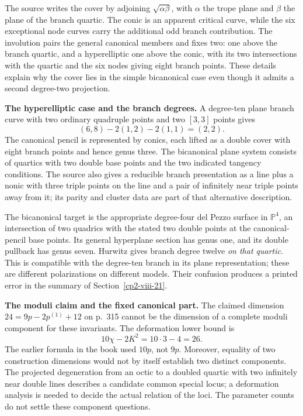 The source writes the cover by adjoining \(\sqrt{\alpha\beta}\), with \(\alpha\) the trope plane and \(\beta\) the plane of the branch quartic. The conic is an apparent critical curve, while the six exceptional node curves carry the additional odd branch contribution. The involution pairs the general canonical members and fixes two: one above the branch quartic, and a hyperelliptic one above the conic, with its two intersections with the quartic and the six nodes giving eight branch points. These details explain why the cover lies in the simple bicanonical case even though it admits a second degree-two projection.

\textbf{The hyperelliptic case and the branch degrees.}
A degree-ten plane branch curve with two ordinary quadruple points and two \([3,3]\) points gives
\[
(6,8)-2(1,2)-2(1,1)=(2,2).
\]
The canonical pencil is represented by conics, each lifted as a double cover with eight branch points and hence genus three. The bicanonical plane system consists of quartics with two double base points and the two indicated tangency conditions. The source also gives a reducible branch presentation as a line plus a nonic with three triple points on the line and a pair of infinitely near triple points away from it; its parity and cluster data are part of that alternative description.

The bicanonical target is the appropriate degree-four del Pezzo surface in \(\mathbb P^4\), an intersection of two quadrics with the stated two double points at the canonical-pencil base points. Its general hyperplane section has genus one, and its double pullback has genus seven. Hurwitz gives branch degree twelve \emph{on that quartic}. This is compatible with the degree-ten branch in its plane representation; these are different polarizations on different models. Their confusion produces a printed error in the summary of Section~\ref{cp2-viii-21}.

\textbf{The moduli claim and the fixed canonical part.}
The claimed dimension \(24=9p-2p^{(1)}+12\) on p.~315 cannot be the dimension of a complete moduli component for these invariants. The deformation lower bound is
\[
10\chi-2K^2=10\cdot3-4=26.
\]
The earlier formula in the book used \(10p\), not \(9p\). Moreover, equality of two construction dimensions would not by itself establish two distinct components. The projected degeneration from an octic to a doubled quartic with two infinitely near double lines describes a candidate common special locus; a deformation analysis is needed to decide the actual relation of the loci. The parameter counts do not settle these component questions.

